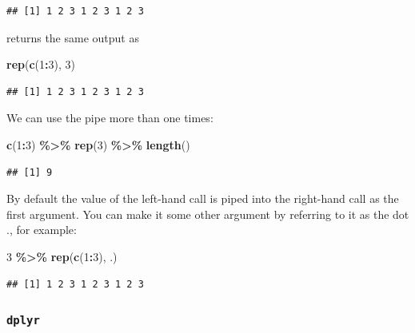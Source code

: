 \documentclass[
]{article}
\newenvironment{Shaded}{\begin{snugshade}}{\end{snugshade}}
\newcommand{\DecValTok}[1]{\textcolor[rgb]{0.00,0.00,0.81}{#1}}
\newcommand{\FunctionTok}[1]{\textcolor[rgb]{0.13,0.29,0.53}{\textbf{#1}}}
\newcommand{\NormalTok}[1]{#1}
\newcommand{\SpecialCharTok}[1]{\textcolor[rgb]{0.81,0.36,0.00}{\textbf{#1}}}
\begin{document}
\begin{verbatim}
## [1] 1 2 3 1 2 3 1 2 3
\end{verbatim}

returns the same output as

\begin{Shaded}
\begin{Highlighting}[]
\FunctionTok{rep}\NormalTok{(}\FunctionTok{c}\NormalTok{(}\DecValTok{1}\SpecialCharTok{:}\DecValTok{3}\NormalTok{), }\DecValTok{3}\NormalTok{)}
\end{Highlighting}
\end{Shaded}

\begin{verbatim}
## [1] 1 2 3 1 2 3 1 2 3
\end{verbatim}

We can use the pipe more than one times:

\begin{Shaded}
\begin{Highlighting}[]
\FunctionTok{c}\NormalTok{(}\DecValTok{1}\SpecialCharTok{:}\DecValTok{3}\NormalTok{) }\SpecialCharTok{\%\textgreater{}\%} \FunctionTok{rep}\NormalTok{(}\DecValTok{3}\NormalTok{) }\SpecialCharTok{\%\textgreater{}\%} \FunctionTok{length}\NormalTok{()}
\end{Highlighting}
\end{Shaded}

\begin{verbatim}
## [1] 9
\end{verbatim}

By default the value of the left-hand call is piped into the right-hand
call as the first argument. You can make it some other argument by
referring to it as the dot ., for example:

\begin{Shaded}
\begin{Highlighting}[]
\DecValTok{3} \SpecialCharTok{\%\textgreater{}\%} \FunctionTok{rep}\NormalTok{(}\FunctionTok{c}\NormalTok{(}\DecValTok{1}\SpecialCharTok{:}\DecValTok{3}\NormalTok{), .) }
\end{Highlighting}
\end{Shaded}

\begin{verbatim}
## [1] 1 2 3 1 2 3 1 2 3
\end{verbatim}

\hypertarget{dplyr}{%
\subsubsection{\texorpdfstring{\texttt{dplyr}}{dplyr}}\label{dplyr}}
\end{document}
